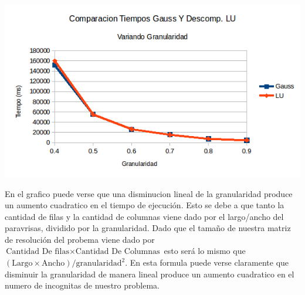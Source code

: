 \begin{center}
 \includegraphics[width=400pt]{imagenes/testeo/granuGauss.png}
\end{center}

En el grafico puede verse que una disminucion lineal de la granularidad produce un aumento cuadratico en el tiempo de ejecución. Esto se debe a que tanto la cantidad de filas y la cantidad de columnas viene dado por el largo/ancho del paravrisas, dividido por la granularidad. Dado que el tamaño de nuestra matriz de resolución del probema viene dado por $\text{Cantidad De filas} \times \text{Cantidad De Columnas}$ esto será lo mismo que  $(\text{Largo} \times \text{Ancho}) / \text{granularidad}^2$. En esta formula puede verse claramente que disminuir la granularidad de manera lineal produce un aumento cuadratico en el numero de incognitas de nuestro problema.

